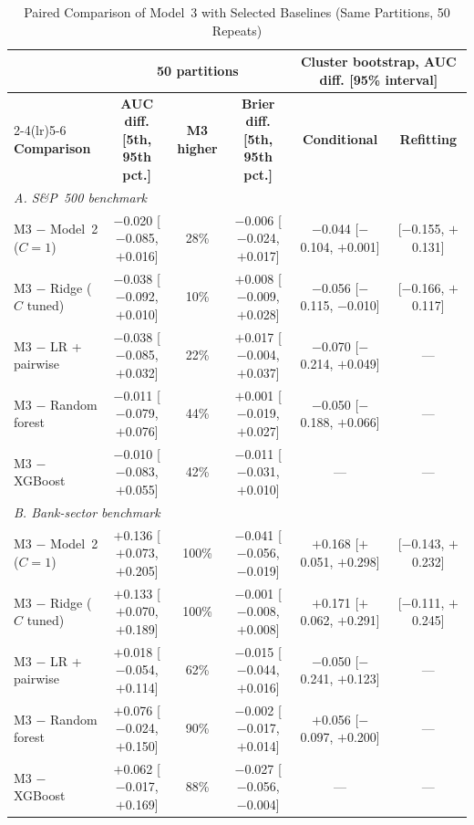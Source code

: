 \begin{table}[!t]
\caption{Paired Comparison of Model~3 with Selected Baselines (Same Partitions, 50 Repeats)}
\label{tab:paired}
\centering
\footnotesize
\begin{tabular*}{\textwidth}{@{\extracolsep{\fill}}lccccc}
\toprule
 & \multicolumn{3}{c}{\textbf{50 partitions}} & \multicolumn{2}{c}{\textbf{Cluster bootstrap, AUC diff. [95\% interval]}} \\
\cmidrule(lr){2-4}\cmidrule(lr){5-6}
\textbf{Comparison} & \textbf{AUC diff. [5th, 95th pct.]} & \textbf{M3 higher} & \textbf{Brier diff. [5th, 95th pct.]} & \textbf{Conditional} & \textbf{Refitting} \\
\midrule
\multicolumn{6}{l}{\textit{A. S\&P~500 benchmark}} \\
M3 $-$ Model~2 ($C=1$) & $-$0.020 [$-$0.085, $+$0.016] & 28\% & $-$0.006 [$-$0.024, $+$0.017] & $-$0.044 [$-$0.104, $+$0.001] & [$-$0.155, $+$0.131] \\
M3 $-$ Ridge ($C$ tuned) & $-$0.038 [$-$0.092, $+$0.010] & 10\% & $+$0.008 [$-$0.009, $+$0.028] & $-$0.056 [$-$0.115, $-$0.010] & [$-$0.166, $+$0.117] \\
M3 $-$ LR + pairwise & $-$0.038 [$-$0.085, $+$0.032] & 22\% & $+$0.017 [$-$0.004, $+$0.037] & $-$0.070 [$-$0.214, $+$0.049] & --- \\
M3 $-$ Random forest & $-$0.011 [$-$0.079, $+$0.076] & 44\% & $+$0.001 [$-$0.019, $+$0.027] & $-$0.050 [$-$0.188, $+$0.066] & --- \\
M3 $-$ XGBoost & $-$0.010 [$-$0.083, $+$0.055] & 42\% & $-$0.011 [$-$0.031, $+$0.010] & --- & --- \\
\midrule
\multicolumn{6}{l}{\textit{B. Bank-sector benchmark}} \\
M3 $-$ Model~2 ($C=1$) & $+$0.136 [$+$0.073, $+$0.205] & 100\% & $-$0.041 [$-$0.056, $-$0.019] & $+$0.168 [$+$0.051, $+$0.298] & [$-$0.143, $+$0.232] \\
M3 $-$ Ridge ($C$ tuned) & $+$0.133 [$+$0.070, $+$0.189] & 100\% & $-$0.001 [$-$0.008, $+$0.008] & $+$0.171 [$+$0.062, $+$0.291] & [$-$0.111, $+$0.245] \\
M3 $-$ LR + pairwise & $+$0.018 [$-$0.054, $+$0.114] & 62\% & $-$0.015 [$-$0.044, $+$0.016] & $-$0.050 [$-$0.241, $+$0.123] & --- \\
M3 $-$ Random forest & $+$0.076 [$-$0.024, $+$0.150] & 90\% & $-$0.002 [$-$0.017, $+$0.014] & $+$0.056 [$-$0.097, $+$0.200] & --- \\
M3 $-$ XGBoost & $+$0.062 [$-$0.017, $+$0.169] & 88\% & $-$0.027 [$-$0.056, $-$0.004] & --- & --- \\

\end{tabular*}
\end{table}
